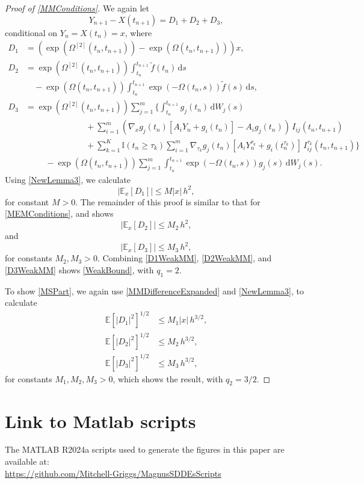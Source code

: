 \documentclass[onefignum]{siamart250211}
\providecommand{\abs}[1]{\left|#1\right|}
\begin{document}
\begin{proof}[Proof of \cref{MMConditions}]
We again let
\begin{equation}Y_{n+1}-X(t_{n+1})=D_1+D_2+D_3\label{MMDifferenceExpanded},\end{equation}
conditional on $Y_n=X(t_n)=x$, where
\begin{align*}
D_1&=\left(\exp\left(\Omega^{[2]}(t_n,t_{n+1})\right)-\exp(\Omega(t_n,t_{n+1}))\right)x,\\
D_2&=\exp\left(\Omega^{[2]}(t_n,t_{n+1})\right)\int_{t_n}^{t_{n+1}}\tilde{f}(t_n)\,\mathrm{d}s\\
&\quad-\exp(\Omega(t_n,t_{n+1}))\int_{t_n}^{t_{n+1}}\exp(-\Omega(t_n,s))\tilde{f}(s)\,\mathrm{d}s,\\
D_3&=\exp\left(\Omega^{[2]}(t_n,t_{n+1})\right)\sum_{j=1}^m\bigg\{\int_{t_n}^{t_{n+1}}g_j(t_n)\,\mathrm{d}W_j(s)\\
&\hspace{3cm}+\sum_{i=1}^m\left(\nabla_xg_j(t_n)[A_iY_n+g_i(t_n)]-A_ig_j(t_n)\right)\,I_{ij}(t_n,t_{n+1})\\
&\hspace{3cm}+\sum_{k=1}^K\mathbb{I}(t_n\geqslant\tau_k)\sum_{i=1}^m\nabla_{\tau_k}g_j(t_n)[A_iY_n^{\tau_k}+g_i(t_n^{\tau_k})]\,I_{ij}^{\tau_k}(t_n,t_{n+1})\bigg\}\\
&\hspace{1cm}-\exp(\Omega(t_n,t_{n+1}))\sum_{j=1}^m\int_{t_n}^{t_{n+1}}\exp(-\Omega(t_n,s))g_j(s)\,\mathrm{d}W_j(s).
\end{align*}
Using \cref{NewLemma3}, we calculate
\begin{equation}\abs{\mathbb{E}_x[D_1]}\leqslant M\abs{x}\,h^2,\label{D1WeakMM}\end{equation}
for constant $M>0$. The remainder of this proof is similar to that for \cref{MEMConditions}, and shows
\begin{equation}\abs{\mathbb{E}_x[D_2]}\leqslant M_2\,h^2,\label{D2WeakMM}\end{equation}
and
\begin{equation}\abs{\mathbb{E}_x[D_3]}\leqslant M_3\,h^2,\label{D3WeakMM}\end{equation}
for constants $M_2,M_3>0$. Combining \cref{D1WeakMM}, \cref{D2WeakMM}, and \cref{D3WeakMM} shows \cref{WeakBound}, with $q_1=2$.

To show \cref{MSPart}, we again use \cref{MMDifferenceExpanded} and \cref{NewLemma3}, to calculate
\begin{align*}
\mathbb{E}\left[\abs{D_1}^2\right]^{1/2}&\leqslant M_1\abs{x}\,h^{3/2},\\
\mathbb{E}\left[\abs{D_2}^2\right]^{1/2}&\leqslant M_2\,h^{3/2},\\
\mathbb{E}\left[\abs{D_3}^2\right]^{1/2}&\leqslant M_3\,h^{3/2},
\end{align*}
for constants $M_1,M_2,M_3>0$, which shows the result, with $q_2=3/2$.
\end{proof}





\section*{Link to Matlab scripts}
The MATLAB R2024a scripts used to generate the figures in this paper are available at:\\
\url{https://github.com/Mitchell-Griggs/MagnusSDDEsScripts}
\end{document}
